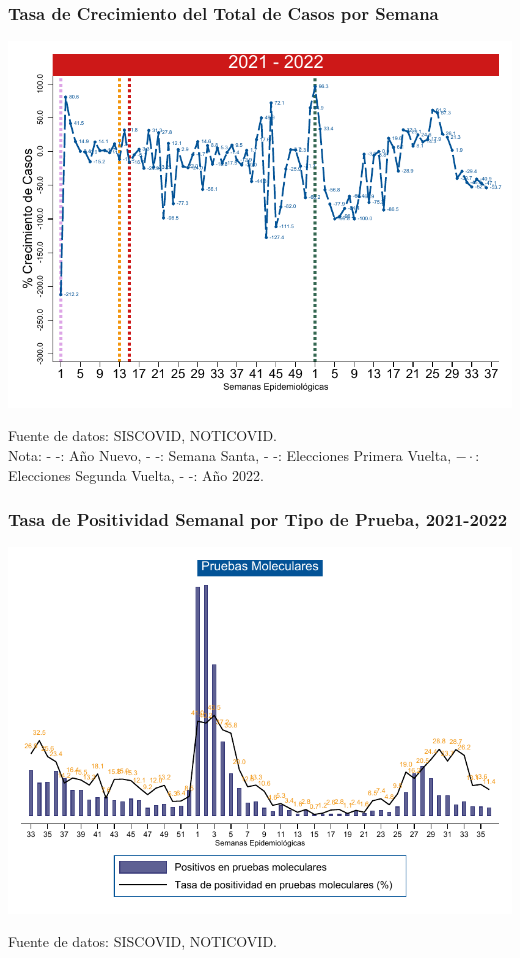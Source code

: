 \documentclass[xcolor=table]{beamer}
\begin{document}
	\begin{frame}
		\frametitle{Tasa de Crecimiento del Total de Casos por Semana}
		\vspace{-.5cm}
		\begin{center}
			\includegraphics[width=0.9\linewidth]{../figuras/positivos_crecimiento_2021_2022.pdf}
		\end{center} 
		{\tiny Fuente de datos: SISCOVID, NOTICOVID. \\
	Nota:{\color{mycolor1} - -: Año Nuevo}, {\color{mycolor2} - -: Semana Santa}, {\color{mycolor3} - -: Elecciones Primera Vuelta}, {\color{mycolor4} $- \cdot$: Elecciones Segunda Vuelta}, {\color{mycolor7} - -: Año 2022}. \\}
	\end{frame}
	
	\begin{frame}
			\frametitle{Tasa de Positividad Semanal por Tipo de Prueba, 2021-2022}
			\vspace{-.5cm}
			\begin{center}
				\includegraphics[width=0.8\linewidth]{../figuras/positividad_pcr.pdf}
			\end{center}
			{\tiny Fuente de datos: SISCOVID, NOTICOVID.}
	\end{frame}
\end{document}
